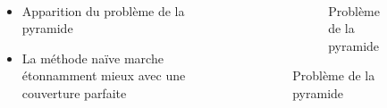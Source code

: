 \begin{frame}[fragile=singleslide]{\insertsectionhead}

  \framesubtitle{\insertsubsectionhead}
  \begin{columns}[T,onlytextwidth]
      \vspace{.6cm}
      \begin{itemize}
        \item Apparition du problème de la pyramide
        \vspace{.3cm}
        \item La méthode naïve marche étonnamment mieux avec une couverture parfaite
      \end{itemize}
    \begin{figure}
        \begin{subfigure}{.8\textwidth}
          \caption*{Problème de la pyramide}
        \end{subfigure}
      \end{figure}
  \end{columns}
\end{frame}

